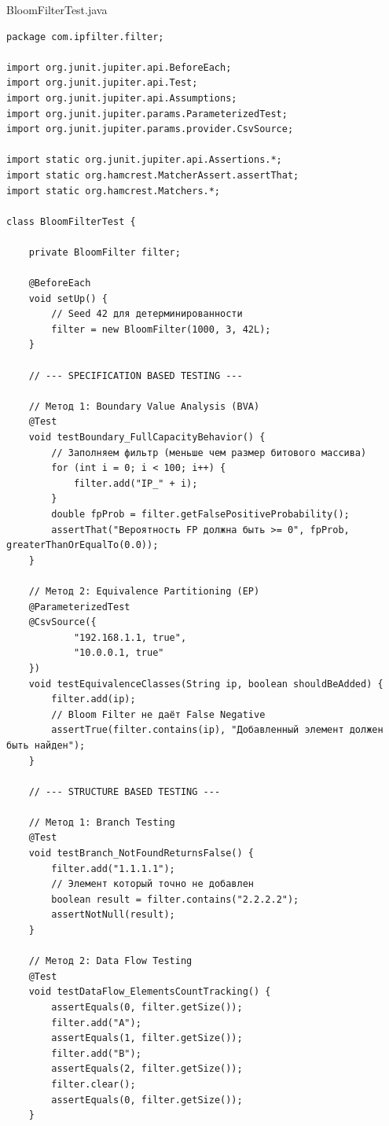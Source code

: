 BloomFilterTest.java
\begin{verbatim}
package com.ipfilter.filter;

import org.junit.jupiter.api.BeforeEach;
import org.junit.jupiter.api.Test;
import org.junit.jupiter.api.Assumptions;
import org.junit.jupiter.params.ParameterizedTest;
import org.junit.jupiter.params.provider.CsvSource;

import static org.junit.jupiter.api.Assertions.*;
import static org.hamcrest.MatcherAssert.assertThat;
import static org.hamcrest.Matchers.*;

class BloomFilterTest {

    private BloomFilter filter;

    @BeforeEach
    void setUp() {
        // Seed 42 для детерминированности
        filter = new BloomFilter(1000, 3, 42L);
    }

    // --- SPECIFICATION BASED TESTING ---

    // Метод 1: Boundary Value Analysis (BVA)
    @Test
    void testBoundary_FullCapacityBehavior() {
        // Заполняем фильтр (меньше чем размер битового массива)
        for (int i = 0; i < 100; i++) {
            filter.add("IP_" + i);
        }
        double fpProb = filter.getFalsePositiveProbability();
        assertThat("Вероятность FP должна быть >= 0", fpProb, greaterThanOrEqualTo(0.0));
    }

    // Метод 2: Equivalence Partitioning (EP)
    @ParameterizedTest
    @CsvSource({
            "192.168.1.1, true",
            "10.0.0.1, true"
    })
    void testEquivalenceClasses(String ip, boolean shouldBeAdded) {
        filter.add(ip);
        // Bloom Filter не даёт False Negative
        assertTrue(filter.contains(ip), "Добавленный элемент должен быть найден");
    }

    // --- STRUCTURE BASED TESTING ---

    // Метод 1: Branch Testing
    @Test
    void testBranch_NotFoundReturnsFalse() {
        filter.add("1.1.1.1");
        // Элемент который точно не добавлен
        boolean result = filter.contains("2.2.2.2");
        assertNotNull(result);
    }

    // Метод 2: Data Flow Testing
    @Test
    void testDataFlow_ElementsCountTracking() {
        assertEquals(0, filter.getSize());
        filter.add("A");
        assertEquals(1, filter.getSize());
        filter.add("B");
        assertEquals(2, filter.getSize());
        filter.clear();
        assertEquals(0, filter.getSize());
    }


\end{verbatim}
